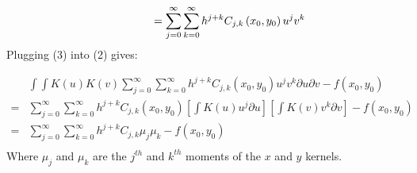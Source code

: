 \documentclass[11pt]{article}
\theoremstyle{definition}
\begin{document}
\begin{equation}
\begin{split}
\hspace{17.5mm} &=  \sum_{j=0}^{\infty} \sum_{k=0}^{\infty} h^{j+k}C_{j,k}\left(x_{0},y_{0}\right)u^{j}v^{k}
\end{split}
\end{equation}
Plugging (3) into (2) gives:

\begin{equation*}
\begin{split}
 &  \int\int K(u) K(v) \sum_{j=0}^{\infty} \sum_{k=0}^{\infty} h^{j+k}C_{j,k}\left(x_{0},y_{0}\right)u^{j}v^{k}\partial{u}\partial{v}-f\left(x_0, y_0\right)  \\ 
=&\sum_{j=0}^{\infty} \sum_{k=0}^{\infty} h^{j+k}C_{j,k}\left(x_{0},y_{0}\right) \left[\int K(u)u^{j}\partial{u}\right] \left[\int K(v)v^{k}\partial{v}\right] -f\left(x_0, y_0\right)  \\ 
=&\sum_{j=0}^{\infty} \sum_{k=0}^{\infty} h^{j+k}C_{j,k}\mu_{j}\mu_{k} -f\left(x_0, y_0\right)  \\ 
\end{split}
\end{equation*}
Where $\mu_{j}$ and $\mu_{k} $ are the $j^{th}$ and $k^{th}$ moments of the $x$ and $y$ kernels.
\end{document}
